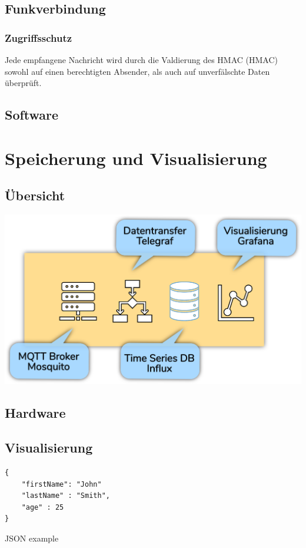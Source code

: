 \documentclass[
  10pt, %
  a4paper, %
  twoside, %
  openright, %
  numbers=noenddot, %
  BCOR=5mm, %
  parskip=half*, %
  thesis, %
]{bfhbook}
\begin{document}
\section{Funkverbindung}
\subsection{Zugriffsschutz}
Jede empfangene Nachricht wird durch die Valdierung des HMAC (\Gls{HMAC}) sowohl auf einen berechtigten Absender, als auch auf unverfälschte Daten überprüft.
\section{Software}
\chapter{Speicherung und Visualisierung}
\section{Übersicht}
\begin{center}
\includegraphics[width=17cm, left]{Bilder/Raspberry-Software.png}%
\label{labelname}%
\end{center}
\section{Hardware}
\section{Visualisierung}
\begin{listing}
\begin{verbatim}
{     
    "firstName": "John"
    "lastName" : "Smith",
    "age" : 25
}
\end{verbatim}
\caption{JSON example} 
\label{json-example}
\end{listing}
\end{document}
